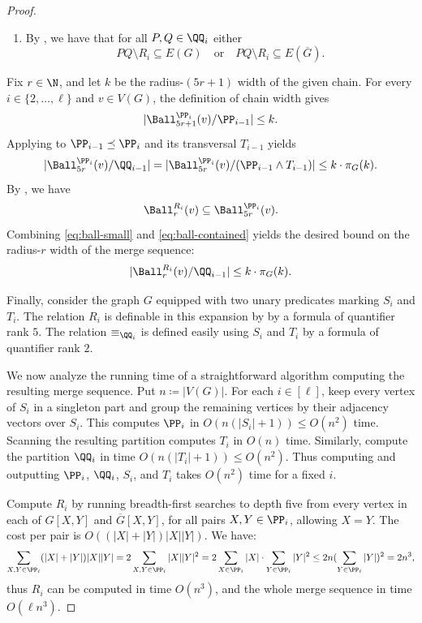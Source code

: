\begin{proof}
\begin{enumerate}
    \item By , we have that for all $P,Q \in \QQ_i$ either
    \[
        PQ \setminus R_i \subseteq E(G)
        \quad
        \text{or}
        \quad
        PQ \setminus R_i \subseteq E(\overline{G}).
    \]
    \end{enumerate}
    Fix $r\in\N$, and let $k$ be the radius-$(5r+1)$ width of the given chain.
    For every $i\in\{2,\ldots,\ell\}$ and $v\in V(G)$, the definition of chain width gives
    \[
        |\Ball_{5r + 1}^{\PP_i}(v) / \PP_{i-1}| \leq k.
    \]
    Applying  to
$\PP_{i-1}\preceq\PP_i$ and its transversal $T_{i-1}$ yields
    \begin{equation}\label{eq:ball-small}
         |\Ball_{5r}^{\PP_i}(v) / \QQ_{i-1} | = |\Ball_{5r}^{\PP_i}(v) / (\PP_{i-1} \wedge T_{i-1})| \leq k \cdot \pi_G(k).
    \end{equation}
    By , we have
    \begin{equation}\label{eq:ball-contained}
        \Ball_{r}^{R_i}(v)
        \subseteq
        \Ball_{5r}^{\PP_i}(v).
    \end{equation}
    Combining \eqref{eq:ball-small} and \eqref{eq:ball-contained} yields the desired bound on the radius-$r$ width of the merge sequence:
    \begin{equation*}
        |\Ball_{r}^{R_i}(v)/\QQ_{i-1}| \leq k \cdot \pi_G(k).
    \end{equation*}

    Finally, consider the graph $G$ equipped with two unary predicates marking $S_i$ and $T_i$.
    The relation $R_i$ is definable in this expansion by  by a formula of quantifier rank $5$.
    The relation $\equiv_{\QQ_i}$ is
    defined easily using $S_i$ and $T_i$ by a formula of quantifier rank $2$.

    We now analyze the running time of a straightforward algorithm computing the resulting merge sequence. Put $n\coloneqq |V(G)|$.
    For each $i\in[\ell]$, keep every vertex of $S_i$ in a singleton part and group the remaining vertices by their adjacency vectors over $S_i$.
    This computes $\PP_i$ in $O(n(|S_i|+1))\le O(n^2)$ time.
    Scanning the resulting partition computes $T_i$ in $O(n)$ time.
    Similarly, compute the partition $\QQ_i$ in time $O(n(|T_i|+1))\le O(n^2)$.
    Thus computing and outputting $\PP_i$, $\QQ_i$, $S_i$, and $T_i$ takes $O(n^2)$ time for a fixed $i$.

    Compute $R_i$ by running breadth-first searches to depth five from every vertex in each of $G[X,Y]$ and $\overline G[X,Y]$, for all pairs $X,Y\in\PP_i$, allowing $X=Y$.
    The cost per pair is $O((|X|+|Y|)|X||Y|)$. We have:
    \[
        \sum_{X,Y\in\PP_i} (|X|+|Y|)|X||Y|
        =2\sum_{X,Y\in\PP_i} |X||Y|^2
        =2\sum_{X\in\PP_i} |X|\cdot \sum_{Y\in\PP_i}|Y|^2
        \le 2n(\sum_{Y\in\PP_i}|Y|)^2=2n^3,
    \]
     thus $R_i$ can be computed in time $O(n^3)$, and the whole merge sequence in time $O(\ell n^3)$.
\end{proof}

